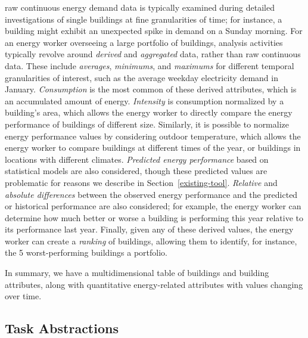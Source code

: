 \documentclass[journal]{vgtc}                %
\newcommand{\bstart}[1]{\vspace{1mm} \noindent{\textbf{#1:}}}
\begin{document}
\bstart{Derived data} raw continuous energy demand data is typically examined during detailed investigations of single buildings at fine granularities of time; for instance, a building might exhibit an unexpected spike in demand on a Sunday morning. 
For an energy worker overseeing a large portfolio of buildings, analysis activities typically revolve around {\it derived} and {\it aggregated} data, rather than raw continuous data. 
These include {\it averages}, {\it minimums}, and {\it maximums} for different temporal granularities of interest, such as the average weekday electricity demand in January.
{\it Consumption} is the most common of these derived attributes, which is an accumulated amount of energy.
{\it Intensity} is consumption normalized by a building's area, which allows the energy worker to directly compare the energy performance of buildings of different size.
Similarly, it is possible to normalize energy performance values by considering outdoor temperature, which allows the energy worker to compare buildings at different times of the year, or buildings in locations with different climates.
{\it Predicted energy performance} based on statistical models are also considered, though these predicted values are problematic for reasons we describe in Section~\ref{existing-tool}.
{\it Relative} and {\it absolute differences} between the observed energy performance and the predicted or historical performance are also considered; for example, the energy worker can determine how much better or worse a building is performing this year relative to its performance last year.
Finally, given any of these derived values, the energy worker can create a {\it ranking} of buildings, allowing them to identify, for instance, the 5 worst-performing buildings a portfolio.

In summary, we have a multidimensional table of buildings and building attributes, along with quantitative energy-related attributes with values changing over time.


\subsection{Task Abstractions}
\label{task-abstractions}

\end{document}
